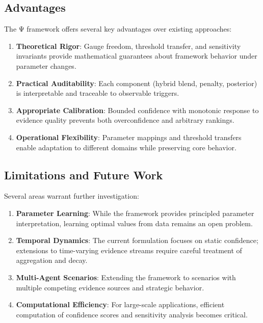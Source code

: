 \documentclass[12pt,a4paper]{article}
\begin{document}
\subsection{Advantages}

The Ψ framework offers several key advantages over existing approaches:

\begin{enumerate}
\item \textbf{Theoretical Rigor}: Gauge freedom, threshold transfer, and sensitivity invariants provide mathematical guarantees about framework behavior under parameter changes.

\item \textbf{Practical Auditability}: Each component (hybrid blend, penalty, posterior) is interpretable and traceable to observable triggers.

\item \textbf{Appropriate Calibration}: Bounded confidence with monotonic response to evidence quality prevents both overconfidence and arbitrary rankings.

\item \textbf{Operational Flexibility}: Parameter mappings and threshold transfers enable adaptation to different domains while preserving core behavior.
\end{enumerate}

\subsection{Limitations and Future Work}

Several areas warrant further investigation:

\begin{enumerate}
\item \textbf{Parameter Learning}: While the framework provides principled parameter interpretation, learning optimal values from data remains an open problem.

\item \textbf{Temporal Dynamics}: The current formulation focuses on static confidence; extensions to time-varying evidence streams require careful treatment of aggregation and decay.

\item \textbf{Multi-Agent Scenarios}: Extending the framework to scenarios with multiple competing evidence sources and strategic behavior.

\item \textbf{Computational Efficiency}: For large-scale applications, efficient computation of confidence scores and sensitivity analysis becomes critical.
\end{enumerate}
\end{document}
